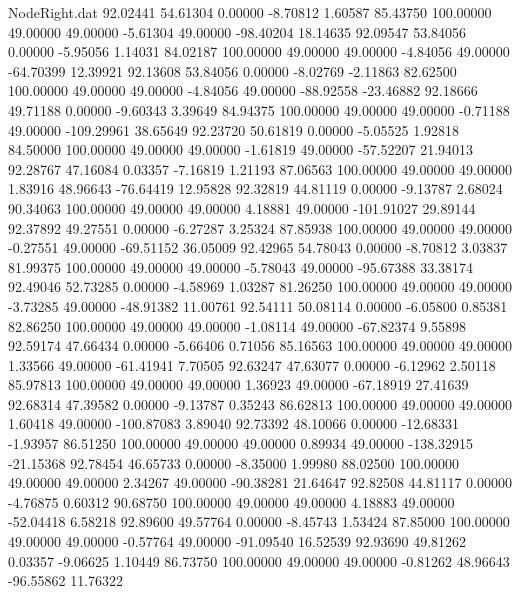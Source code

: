 \begin{filecontents}{NodeRight.dat}
  92.02441   54.61304    0.00000    -8.70812    1.60587   85.43750  100.00000   49.00000   49.00000   -5.61304   49.00000  -98.40204   18.14635
  92.09547   53.84056    0.00000    -5.95056    1.14031   84.02187  100.00000   49.00000   49.00000   -4.84056   49.00000  -64.70399   12.39921
  92.13608   53.84056    0.00000    -8.02769   -2.11863   82.62500  100.00000   49.00000   49.00000   -4.84056   49.00000  -88.92558  -23.46882
  92.18666   49.71188    0.00000    -9.60343    3.39649   84.94375  100.00000   49.00000   49.00000   -0.71188   49.00000 -109.29961   38.65649
  92.23720   50.61819    0.00000    -5.05525    1.92818   84.50000  100.00000   49.00000   49.00000   -1.61819   49.00000  -57.52207   21.94013
  92.28767   47.16084    0.03357    -7.16819    1.21193   87.06563  100.00000   49.00000   49.00000    1.83916   48.96643  -76.64419   12.95828
  92.32819   44.81119    0.00000    -9.13787    2.68024   90.34063  100.00000   49.00000   49.00000    4.18881   49.00000 -101.91027   29.89144
  92.37892   49.27551    0.00000    -6.27287    3.25324   87.85938  100.00000   49.00000   49.00000   -0.27551   49.00000  -69.51152   36.05009
  92.42965   54.78043    0.00000    -8.70812    3.03837   81.99375  100.00000   49.00000   49.00000   -5.78043   49.00000  -95.67388   33.38174
  92.49046   52.73285    0.00000    -4.58969    1.03287   81.26250  100.00000   49.00000   49.00000   -3.73285   49.00000  -48.91382   11.00761
  92.54111   50.08114    0.00000    -6.05800    0.85381   82.86250  100.00000   49.00000   49.00000   -1.08114   49.00000  -67.82374    9.55898
  92.59174   47.66434    0.00000    -5.66406    0.71056   85.16563  100.00000   49.00000   49.00000    1.33566   49.00000  -61.41941    7.70505
  92.63247   47.63077    0.00000    -6.12962    2.50118   85.97813  100.00000   49.00000   49.00000    1.36923   49.00000  -67.18919   27.41639
  92.68314   47.39582    0.00000    -9.13787    0.35243   86.62813  100.00000   49.00000   49.00000    1.60418   49.00000 -100.87083    3.89040
  92.73392   48.10066    0.00000   -12.68331   -1.93957   86.51250  100.00000   49.00000   49.00000    0.89934   49.00000 -138.32915  -21.15368
  92.78454   46.65733    0.00000    -8.35000    1.99980   88.02500  100.00000   49.00000   49.00000    2.34267   49.00000  -90.38281   21.64647
  92.82508   44.81117    0.00000    -4.76875    0.60312   90.68750  100.00000   49.00000   49.00000    4.18883   49.00000  -52.04418    6.58218
  92.89600   49.57764    0.00000    -8.45743    1.53424   87.85000  100.00000   49.00000   49.00000   -0.57764   49.00000  -91.09540   16.52539
  92.93690   49.81262    0.03357    -9.06625    1.10449   86.73750  100.00000   49.00000   49.00000   -0.81262   48.96643  -96.55862   11.76322

\end{filecontents}
